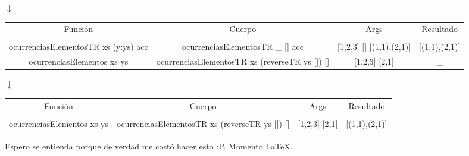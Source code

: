 \begin{enumerate}
{\begin{itemize}
{\begin{center}
                $\downarrow$
                
                \begin{NiceTabular}{|c c c c|}
                    Función & Cuerpo & Args & Resultado \\
                    &&&\\
                    ocurrenciasElementosTR xs (y:ys) acc & ocurrenciasElementosTR \_ [] acc & [1,2,3] [] [(1,1),(2,1)] & [(1,1),(2,1)] \\ \hline
                    ocurrenciasElementos xs ys & ocurrenciasElementosTR xs (reverseTR ys []) [] & [1,2,3] [2,1] & \_ \\ \hline
                \end{NiceTabular}

                $\downarrow$
                
                \begin{NiceTabular}{|c c c c|}
                    Función & Cuerpo & Args & Resultado \\
                    &&&\\
                    ocurrenciasElementos xs ys & ocurrenciasElementosTR xs (reverseTR ys []) [] & [1,2,3] [2,1] & [(1,1),(2,1)] \\ \hline
                \end{NiceTabular}
                \end{center}
                \vfill
                \hfill *Espero se entienda porque de verdad me costó hacer esto :P. Momento \LaTeX.
            }
        \end{itemize}
    }
\end{enumerate}